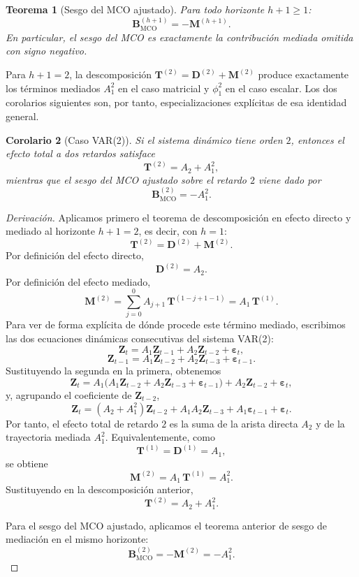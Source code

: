 \documentclass[12pt]{report} %
\newtheorem{theorem}{Teorema}
\newtheorem{corollary}[theorem]{Corolario}
\begin{document}
\begin{theorem}[Sesgo del MCO ajustado]
    Para todo horizonte $h+1 \geq 1$:
    $$\mathbf{B}_{\mathrm{MCO}}^{(h+1)} = -\mathbf{M}^{(h+1)}.$$
    En particular, el sesgo del MCO es exactamente la contribución mediada omitida con signo negativo.
\end{theorem}

Para $h+1=2$, la descomposición $\mathbf{T}^{(2)} = \mathbf{D}^{(2)} + \mathbf{M}^{(2)}$ produce exactamente los términos mediados $A_1^2$ en el caso matricial y $\phi_1^2$ en el caso escalar. Los dos corolarios siguientes son, por tanto, especializaciones explícitas de esa identidad general.

\begin{corollary}[Caso VAR(2)]
    Si el sistema dinámico tiene orden $2$, entonces el efecto total a dos retardos satisface
    $$\mathbf{T}^{(2)} = A_2 + A_1^2,$$
    mientras que el sesgo del MCO ajustado sobre el retardo $2$ viene dado por
    $$\mathbf{B}_{\mathrm{MCO}}^{(2)} = -A_1^2.$$
\end{corollary}
\begin{proof}[Derivación]
    Aplicamos primero el teorema de descomposición en efecto directo y mediado al horizonte $h+1=2$, es decir, con $h=1$:
    $$\mathbf{T}^{(2)} = \mathbf{D}^{(2)} + \mathbf{M}^{(2)}.$$
    Por definición del efecto directo,
    $$\mathbf{D}^{(2)} = A_2.$$
    Por definición del efecto mediado,
    $$\mathbf{M}^{(2)} = \sum_{j=0}^{0} A_{j+1}\,\mathbf{T}^{(1-j+1-1)} = A_1\,\mathbf{T}^{(1)}.$$
    Para ver de forma explícita de dónde procede este término mediado, escribimos las dos ecuaciones dinámicas consecutivas del sistema VAR(2):
    $$\mathbf{Z}_t = A_1\mathbf{Z}_{t-1} + A_2\mathbf{Z}_{t-2} + \boldsymbol{\varepsilon}_t,$$
    $$\mathbf{Z}_{t-1} = A_1\mathbf{Z}_{t-2} + A_2\mathbf{Z}_{t-3} + \boldsymbol{\varepsilon}_{t-1}.$$
    Sustituyendo la segunda en la primera, obtenemos
    $$\mathbf{Z}_t = A_1\bigl(A_1\mathbf{Z}_{t-2} + A_2\mathbf{Z}_{t-3} + \boldsymbol{\varepsilon}_{t-1}\bigr) + A_2\mathbf{Z}_{t-2} + \boldsymbol{\varepsilon}_t,$$
    y, agrupando el coeficiente de $\mathbf{Z}_{t-2}$,
    $$\mathbf{Z}_t = (A_2 + A_1^2)\mathbf{Z}_{t-2} + A_1A_2\mathbf{Z}_{t-3} + A_1\boldsymbol{\varepsilon}_{t-1} + \boldsymbol{\varepsilon}_t.$$
    Por tanto, el efecto total de retardo $2$ es la suma de la arista directa $A_2$ y de la trayectoria mediada $A_1^2$. Equivalentemente, como
    $$\mathbf{T}^{(1)} = \mathbf{D}^{(1)} = A_1,$$
    se obtiene
    $$\mathbf{M}^{(2)} = A_1\,\mathbf{T}^{(1)} = A_1^2.$$
    Sustituyendo en la descomposición anterior,
    $$\mathbf{T}^{(2)} = A_2 + A_1^2.$$

    Para el sesgo del MCO ajustado, aplicamos el teorema anterior de sesgo de mediación en el mismo horizonte:
    $$\mathbf{B}_{\mathrm{MCO}}^{(2)} = -\mathbf{M}^{(2)} = -A_1^2.$$
\end{proof}
\end{document}
